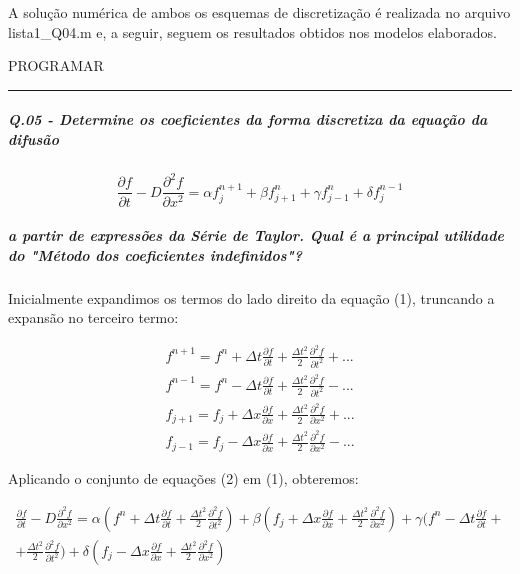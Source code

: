 \documentclass[11pt]{article}
\begin{document}
A solução numérica de ambos os esquemas de discretização é realizada no
arquivo lista1\_Q04.m e, a seguir, seguem os resultados obtidos nos
modelos elaborados.

PROGRAMAR

    \begin{center}\rule{0.5\linewidth}{\linethickness}\end{center}

    \subparagraph{Q.05 - Determine os coeficientes da forma discretiza da
equação da
difusão}\label{q.05---determine-os-coeficientes-da-forma-discretiza-da-equauxe7uxe3o-da-difusuxe3o}

\begin{equation}
    \frac{\partial{f}}{\partial{t}} - D\frac{\partial^2{f}}{\partial{x^2}} = \alpha f^{n+1}_{j} + \beta f^{n}_{j+1} + \gamma f^{n}_{j-1} + \delta f^{n-1}_{j}
\end{equation}

\subparagraph{a partir de expressões da Série de Taylor. Qual é a
principal utilidade do "Método dos coeficientes
indefinidos"?}\label{a-partir-de-expressuxf5es-da-suxe9rie-de-taylor.-qual-uxe9-a-principal-utilidade-do-muxe9todo-dos-coeficientes-indefinidos}

Inicialmente expandimos os termos do lado direito da equação (1),
truncando a expansão no terceiro termo:

\begin{equation}
\begin{aligned}
    f^{n+1} = f^{n} + \Delta{t}\frac{\partial{f}}{\partial{t}} + \frac{\Delta{t}^2}{2}\frac{\partial^2{f}}{\partial{t^2}} + ...
    \\
    f^{n-1} = f^{n} - \Delta{t}\frac{\partial{f}}{\partial{t}} + \frac{\Delta{t}^2}{2}\frac{\partial^2{f}}{\partial{t^2}} - ...
    \\
    f_{j+1} = f_{j} + \Delta{x}\frac{\partial{f}}{\partial{x}} + \frac{\Delta{t}^2}{2}\frac{\partial^2{f}}{\partial{x^2}} + ...
    \\
    f_{j-1} = f_{j} - \Delta{x}\frac{\partial{f}}{\partial{x}} + \frac{\Delta{t}^2}{2}\frac{\partial^2{f}}{\partial{x^2}} - ...
\end{aligned}
\end{equation}

Aplicando o conjunto de equações (2) em (1), obteremos:

\begin{equation}
\begin{aligned}
    \frac{\partial{f}}{\partial{t}} - D\frac{\partial^2{f}}{\partial{x^2}} = 
    \alpha (f^{n} + \Delta{t}\frac{\partial{f}}{\partial{t}} + \frac{\Delta{t}^2}{2}\frac{\partial^2{f}}{\partial{t^2}}) + 
    \beta (f_{j} + \Delta{x}\frac{\partial{f}}{\partial{x}} + \frac{\Delta{t}^2}{2}\frac{\partial^2{f}}{\partial{x^2}}) + 
    \gamma (f^{n} - \Delta{t}\frac{\partial{f}}{\partial{t}} + \\ + \frac{\Delta{t}^2}{2}\frac{\partial^2{f}}{\partial{t^2}}) + 
    \delta (f_{j} - \Delta{x}\frac{\partial{f}}{\partial{x}} + \frac{\Delta{t}^2}{2}\frac{\partial^2{f}}{\partial{x^2}})
\end{aligned}
\end{equation}
\end{document}
